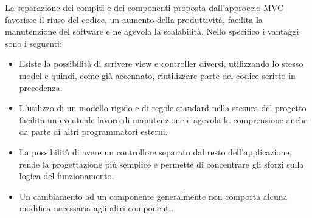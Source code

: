 La separazione dei compiti e dei componenti proposta dall'approccio MVC favorisce il riuso del codice, un aumento della produttività, facilita la manutenzione del software e ne agevola la scalabilità. Nello specifico i vantaggi sono i seguenti:
\begin{itemize}
    \item Esiste la possibilità di scrivere view e controller diversi, utilizzando lo stesso model e quindi, come già accennato, riutilizzare parte del codice scritto in precedenza.
    \item L'utilizzo di un modello rigido e di regole standard nella stesura del progetto facilita un eventuale lavoro di manutenzione e agevola la comprensione anche da parte di altri programmatori esterni.
    \item La possibilità di avere un controllore separato dal resto dell’applicazione, rende la progettazione più semplice e permette di concentrare gli sforzi sulla logica del funzionamento.
    \item Un cambiamento ad un componente generalmente non comporta alcuna modifica necessaria agli altri componenti.
\end{itemize}
